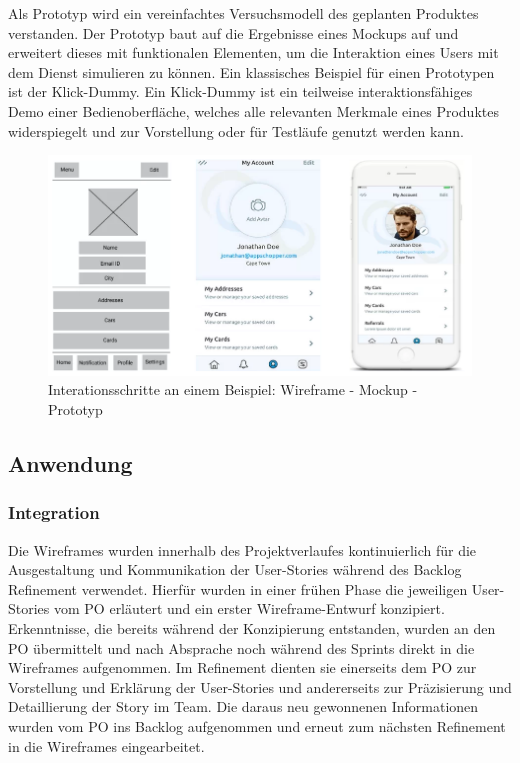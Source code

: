 
Als Prototyp wird ein vereinfachtes Versuchsmodell des geplanten Produktes verstanden. Der Prototyp baut auf die Ergebnisse eines Mockups auf und erweitert dieses mit funktionalen Elementen, um die Interaktion eines Users mit dem Dienst simulieren zu können.
Ein klassisches Beispiel für einen Prototypen ist der Klick-Dummy. Ein Klick-Dummy ist ein teilweise interaktionsfähiges Demo einer Bedienoberfläche, welches alle relevanten Merkmale eines Produktes widerspiegelt und \ua zur Vorstellung oder für Testläufe genutzt werden kann.

\begin{figure}
    \centering
    \includegraphics[scale=2]{figures/jan/Wire_Fixes-Wire-prototyp.png}
    \caption[Interationsschritte an einem Beispiel: Wireframe - Mockup - Prototyp]{Interationsschritte an einem Beispiel: Wireframe - Mockup - Prototyp}
    \label{fig:image}
\end{figure}

\subsection{Anwendung}
\subsubsection{Integration}

Die Wireframes wurden innerhalb des Projektverlaufes kontinuierlich für die Ausgestaltung und Kommunikation der User-Stories während des Backlog Refinement verwendet. Hierfür wurden in einer frühen Phase die jeweiligen User-Stories vom PO erläutert und ein erster Wireframe-Entwurf konzipiert. Erkenntnisse, die bereits während der Konzipierung entstanden, wurden an den PO übermittelt und nach Absprache noch während des Sprints direkt in die Wireframes aufgenommen.
Im Refinement dienten sie einerseits dem PO zur Vorstellung und Erklärung der User-Stories und andererseits zur Präzisierung und Detaillierung der Story im Team.
Die daraus neu gewonnenen Informationen wurden vom PO ins Backlog aufgenommen und erneut zum nächsten Refinement in die Wireframes eingearbeitet.


